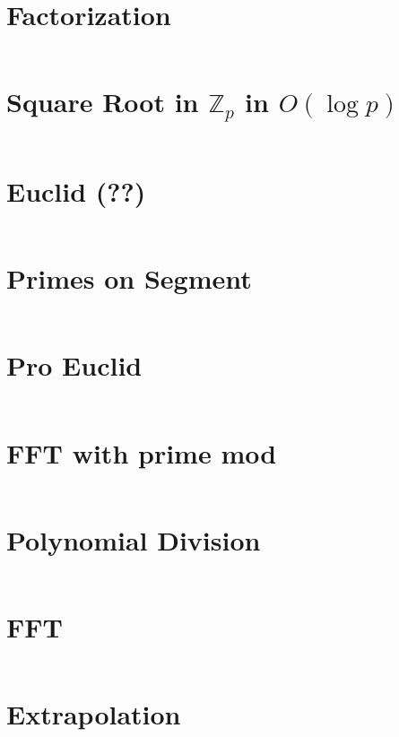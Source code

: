 \documentclass{article}
\begin{document}
\begin{multicols}{2}
\section*{Factorization}
\inputminted[frame=single,breaklines]{cpp}{../pollard-rho.cpp}

\section*{Square Root in $\mathbb{Z}_p$ in $O(\log{p})$}
\inputminted[frame=single,breaklines]{cpp}{../sqrtmod.cpp}

\section*{Euclid (??)}
\inputminted[frame=single,breaklines]{cpp}{../euclid.cpp}

\section*{Primes on Segment}
\inputminted[frame=single,breaklines]{cpp}{../sum_powers_primes_on_segment_short.cpp}

\section*{Pro Euclid}
\inputminted[frame=single,breaklines]{cpp}{../pro-euclid.cpp}

\section*{FFT with prime mod}
\inputminted[frame=single,breaklines]{cpp}{../fft_with_prime_mod.cpp}

\section*{Polynomial Division}
\inputminted[frame=single,breaklines]{cpp}{../polynom_division.cpp}

\section*{FFT}
\inputminted[frame=single,breaklines]{cpp}{../fft.cpp}

\section*{Extrapolation}
\inputminted[frame=single,breaklines]{cpp}{../extrapolation.cpp}


\end{multicols}
\end{document}
